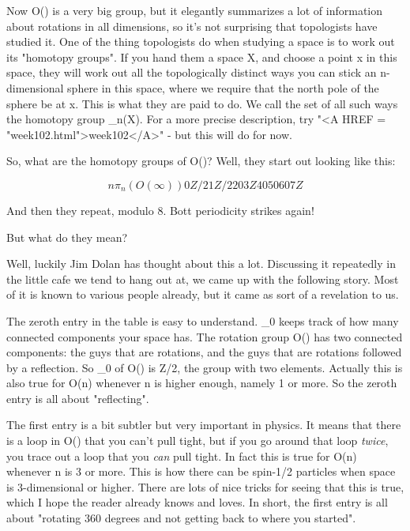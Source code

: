 Now O(\infty ) is a very big group, but it elegantly summarizes a lot
of information about rotations in all dimensions, so it's not
surprising that topologists have studied it.  One of the thing
topologists do when studying a space is to work out its "homotopy
groups".  If you hand them a space X, and choose a point x in this
space, they will work out all the topologically distinct ways you can
stick an n-dimensional sphere in this space, where we require that the
north pole of the sphere be at x.  This is what they are paid to do.
We call the set of all such ways the homotopy group \pi _{n}(X).  For a
more precise description, try "<A HREF = "week102.html">week102</A>" - but this will do for now.

So, what are the homotopy groups of O(\infty )?  Well, they start out
looking like this:

$$
n       \pi _{n}(O(\infty ))

0         Z/2
1         Z/2
2          0
3          Z
4          0
5          0
6          0
7          Z
$$
    
And then they repeat, modulo 8.  Bott periodicity strikes again!

But what do they mean?

Well, luckily Jim Dolan has thought about this a lot.  Discussing
it repeatedly in the little cafe we tend to hang out at, we came up
with the following story.  Most of it is known to various people
already, but it came as sort of a revelation to us.

The zeroth entry in the table is easy to understand.  \pi _{0} keeps track
of how many connected components your space has.  The rotation group
O(\infty ) has two connected components: the guys that are rotations,
and the guys that are rotations followed by a reflection.  So \pi _{0} of
O(\infty ) is Z/2, the group with two elements.  Actually this is
also true for O(n) whenever n is higher enough, namely 1 or more.
So the zeroth entry is all about "reflecting".  

The first entry is a bit subtler but very important in physics.  It
means that there is a loop in O(\infty ) that you can't pull tight,
but if you go around that loop \emph{twice}, you trace out a loop that you
\emph{can} pull tight.  In fact this is true for O(n) whenever n is 3 or
more.  This is how there can be spin-1/2 particles when space is
3-dimensional or higher.  There are lots of nice tricks for seeing
that this is true, which I hope the reader already knows and loves.
In short, the first entry is all about "rotating 360 degrees and not
getting back to where you started".

